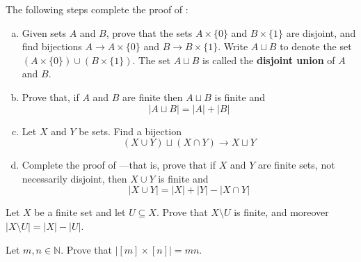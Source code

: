 \begin{exercise}
\label{exSizeOfUnion}
The following steps complete the proof of :
\begin{enumerate}[(a)]
\item Given sets $A$ and $B$, prove that the sets $A \times \{ 0 \}$ and $B \times \{ 1 \}$ are disjoint, and find bijections $A \to A \times \{ 0 \}$ and $B \to B \times \{ 1 \}$. Write $A \sqcup B$  to denote the set $(A \times \{ 0 \}) \cup (B \times \{ 1 \})$. The set $A \sqcup B$ is called the \textbf{disjoint union} of $A$ and $B$.
\item Prove that, if $A$ and $B$ are finite then $A \sqcup B$ is finite and
\[ |A \sqcup B| = |A| + |B| \]
\item Let $X$ and $Y$ be sets. Find a bijection
\[ (X \cup Y) \sqcup (X \cap Y) \to X \sqcup Y \]
\item Complete the proof of ---that is, prove that if $X$ and $Y$ are finite sets, not necessarily disjoint, then $X \cup Y$ is finite and
\[ |X \cup Y| = |X| + |Y| - |X \cap Y| \]
\end{enumerate}
\end{exercise}

\begin{exercise}
Let $X$ be a finite set and let $U \subseteq X$. Prove that $X \setminus U$ is finite, and moreover $|X \setminus U| = |X| - |U|$.
\end{exercise}

\begin{exercise}
\label{exSizeOfCartesianProduct}
Let $m,n \in \mathbb{N}$. Prove that $|[m] \times [n]| = mn$.
\end{exercise}
